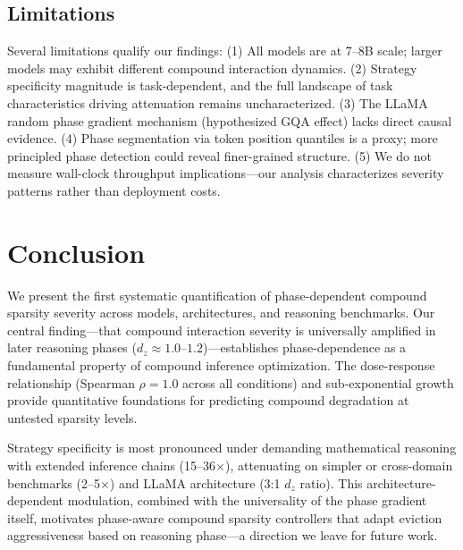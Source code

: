 \documentclass[11pt,a4paper]{article}
\begin{document}
\subsection{Limitations}

Several limitations qualify our findings: (1) All models are at 7--8B scale; larger models may exhibit different compound interaction dynamics. (2) Strategy specificity magnitude is task-dependent, and the full landscape of task characteristics driving attenuation remains uncharacterized. (3) The LLaMA random phase gradient mechanism (hypothesized GQA effect) lacks direct causal evidence. (4) Phase segmentation via token position quantiles is a proxy; more principled phase detection could reveal finer-grained structure. (5) We do not measure wall-clock throughput implications---our analysis characterizes severity patterns rather than deployment costs.

\section{Conclusion}

We present the first systematic quantification of phase-dependent compound sparsity severity across models, architectures, and reasoning benchmarks. Our central finding---that compound interaction severity is universally amplified in later reasoning phases ($d_z \approx 1.0$--$1.2$)---establishes phase-dependence as a fundamental property of compound inference optimization. The dose-response relationship (Spearman $\rho = 1.0$ across all conditions) and sub-exponential growth provide quantitative foundations for predicting compound degradation at untested sparsity levels.

Strategy specificity is most pronounced under demanding mathematical reasoning with extended inference chains (15--36$\times$), attenuating on simpler or cross-domain benchmarks (2--5$\times$) and LLaMA architecture (3:1 $d_z$ ratio). This architecture-dependent modulation, combined with the universality of the phase gradient itself, motivates phase-aware compound sparsity controllers that adapt eviction aggressiveness based on reasoning phase---a direction we leave for future work.


\end{document}
